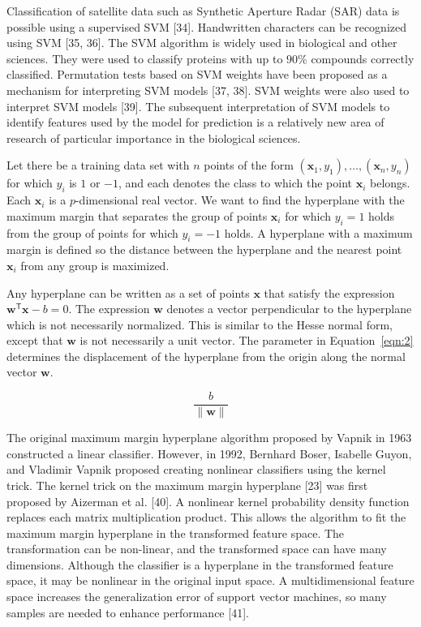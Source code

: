 \documentclass[preprint,12pt]{elsarticle}
\begin{document}
Classification of satellite data such as Synthetic Aperture Radar (SAR) data is possible using a supervised SVM [34]. Handwritten characters can be recognized using SVM [35, 36]. The SVM algorithm is widely used in biological and other sciences. They were used to classify proteins with up to $90\%$ compounds correctly classified. Permutation tests based on SVM weights have been proposed as a mechanism for interpreting SVM models [37, 38]. SVM weights were also used to interpret SVM models [39]. The subsequent interpretation of SVM models to identify features used by the model for prediction is a relatively new area of research of particular importance in the biological sciences.

Let there be a training data set with $n$ points of the form $(\mathbf{x}_{1},y_{1}),\ldots,(\mathbf{x}_{n},y_{n})$ for which $y_{i}$ is $1$ or $-1$, and each denotes the class to which the point $\mathbf{x}_{i}$ belongs. Each $\mathbf{x}_{i}$ is a $p$-dimensional real vector. We want to find the hyperplane with the maximum margin that separates the group of points $\mathbf{x}_{i}$ for which $y_{i}=1$ holds from the group of points for which $y_{i}=-1$ holds. A hyperplane with a maximum margin is defined so the distance between the hyperplane and the nearest point $\mathbf{x}_{i}$ from any group is maximized.

Any hyperplane can be written as a set of points $\mathbf{x}$ that satisfy the expression $\mathbf{w}^{\mathsf{T}}\mathbf{x} -b=0$. The expression $\mathbf{w}$ denotes a vector perpendicular to the hyperplane which is not necessarily normalized. This is similar to the Hesse normal form, except that $\mathbf{w}$ is not necessarily a unit vector. The parameter in Equation~\ref{eqn:2} determines the displacement of the hyperplane from the origin along the normal vector $\mathbf{w}$.

\begin{equation}
	\frac{b}{\|\mathbf{w} \|}
	\label{eqn:2}
\end{equation}

The original maximum margin hyperplane algorithm proposed by Vapnik in 1963 constructed a linear classifier. However, in 1992, Bernhard Boser, Isabelle Guyon, and Vladimir Vapnik proposed creating nonlinear classifiers using the kernel trick. The kernel trick on the maximum margin hyperplane [23] was first proposed by Aizerman et al. [40]. A nonlinear kernel probability density function replaces each matrix multiplication product. This allows the algorithm to fit the maximum margin hyperplane in the transformed feature space. The transformation can be non-linear, and the transformed space can have many dimensions. Although the classifier is a hyperplane in the transformed feature space, it may be nonlinear in the original input space. A multidimensional feature space increases the generalization error of support vector machines, so many samples are needed to enhance performance [41]. 
\end{document}
